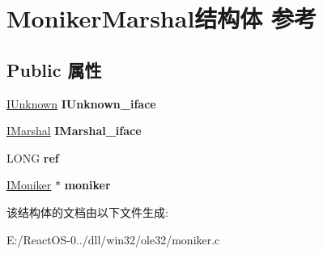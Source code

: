 \hypertarget{struct_moniker_marshal}{}\section{Moniker\+Marshal结构体 参考}
\label{struct_moniker_marshal}
\subsection*{Public 属性}
\begin{DoxyCompactItemize}
\item 
\mbox{\label{struct_moniker_marshal_a5c3ec5fb5dac191cd117fc0964fbb15e}} 
\hyperlink{interface_i_unknown}{I\+Unknown} {\bfseries I\+Unknown\+\_\+iface}
\item 
\mbox{\label{struct_moniker_marshal_a06b8708d0172df720b2c7c3d9715a5ef}} 
\hyperlink{interface_i_marshal}{I\+Marshal} {\bfseries I\+Marshal\+\_\+iface}
\item 
\mbox{\label{struct_moniker_marshal_a7fe205857ea450ce23cdb711d6698252}} 
L\+O\+NG {\bfseries ref}
\item 
\mbox{\label{struct_moniker_marshal_aa1d290f7af54f2c300bc45920a28c129}} 
\hyperlink{interface_i_moniker}{I\+Moniker} $\ast$ {\bfseries moniker}
\end{DoxyCompactItemize}


该结构体的文档由以下文件生成\+:\begin{DoxyCompactItemize}
\item 
E\+:/\+React\+O\+S-\/0../dll/win32/ole32/moniker.\+c\end{DoxyCompactItemize}
